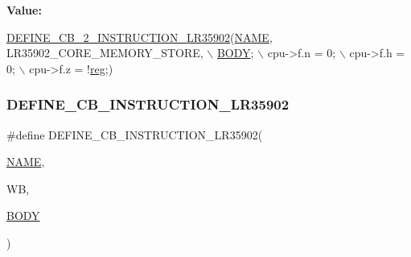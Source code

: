 {\bfseries Value\+:}
\begin{DoxyCode}
\mbox{\hyperlink{isa-lr35902_8c_a9f057efe45467caaaec1c9642e860178}{DEFINE\_CB\_2\_INSTRUCTION\_LR35902}}(\mbox{\hyperlink{inflate_8h_a164ea0159d5f0b5f12a646f25f99eceaa67bc2ced260a8e43805d2480a785d312}{NAME}}, LR35902\_CORE\_MEMORY\_STORE, \(\backslash\)
        \mbox{\hyperlink{gzlog_8c_aa6bdf6a6d9916c343e1e17774d84a156}{BODY}}; \(\backslash\)
        cpu->f.n = 0; \(\backslash\)
        cpu->f.h = 0; \(\backslash\)
        cpu->f.z = !\mbox{\hyperlink{decoder-arm_8c_af44c02f7785479603f59b662f3dfae6a}{reg}};)
\end{DoxyCode}
\mbox{\label{isa-lr35902_8c_a22064acd9c378f27211a391857757a2b}} 
\subsubsection{\texorpdfstring{D\+E\+F\+I\+N\+E\+\_\+\+C\+B\+\_\+\+I\+N\+S\+T\+R\+U\+C\+T\+I\+O\+N\+\_\+\+L\+R35902}{DEFINE\_CB\_INSTRUCTION\_LR35902}}
{\footnotesize\ttfamily \#define D\+E\+F\+I\+N\+E\+\_\+\+C\+B\+\_\+\+I\+N\+S\+T\+R\+U\+C\+T\+I\+O\+N\+\_\+\+L\+R35902(\begin{DoxyParamCaption}\item[{}]{\mbox{\hyperlink{inflate_8h_a164ea0159d5f0b5f12a646f25f99eceaa67bc2ced260a8e43805d2480a785d312}{N\+A\+ME}},  }\item[{}]{WB,  }\item[{}]{\mbox{\hyperlink{gzlog_8c_aa6bdf6a6d9916c343e1e17774d84a156}{B\+O\+DY}} }\end{DoxyParamCaption})}

